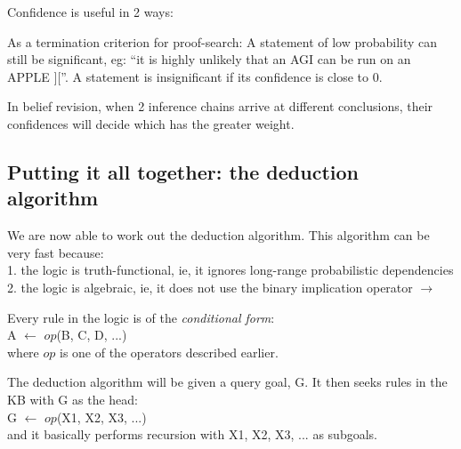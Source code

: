 Confidence is useful in 2 ways:
\begin{compactenum}[1.]
\item  As a termination criterion for proof-search:  A statement of low probability can still be significant, eg: ``it is highly unlikely that an AGI can be run on an APPLE $][$''.  A statement is insignificant if its confidence is close to 0.
\item  In belief revision, when 2 inference chains arrive at different conclusions, their confidences will decide which has the greater weight.
\end{compactenum}

\subsection{Putting it all together: the deduction algorithm}

We are now able to work out the deduction algorithm.  This algorithm can be very fast because:\\
1.  the logic is truth-functional, ie, it ignores long-range probabilistic dependencies\\
2.  the logic is algebraic, ie, it does not use the binary implication operator $\rightarrow$

Every rule in the logic is of the \textit{conditional form}:\\
\hspace*{1cm} A $\leftarrow$ $op$(B, C, D, ...)\\
where $op$ is one of the operators described earlier.

The deduction algorithm will be given a query goal, G.  It then seeks rules in the KB with G as the head:\\
\hspace*{1cm} G $\leftarrow$ $op$(X1, X2, X3, ...)\\
and it basically performs recursion with X1, X2, X3, ... as subgoals.


